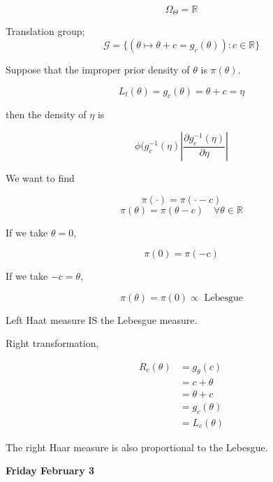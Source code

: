 \documentclass[11pt,fleqn]{book} %
\begin{document}
\begin{example}
	$$ \Omega_\Theta = \mathbb{R}$$

Translation group;
	$$\mathcal{G} = \{(\theta \mapsto \theta + c = g_c(\theta)): c \in \mathbb{R} \} $$


Suppose that the improper prior density of $\theta$ is $\pi(\theta)$. 

		$$L_t(\theta)= g_c(\theta) = \theta + c = \eta $$

then the density of $\eta$ is 

		$$\phi(g_c^{-1}(\eta) |\frac{\partial g_c^{-1}(\eta)}{\partial\eta}| $$

We want to find

		$$\pi(\cdot)  = \pi(\cdot - c) $$
		$$ \pi(\theta)  = \pi(\theta - c) \quad \forall \theta \in \mathbb{R}$$

If we take $\theta = 0$, 

	$$\pi(0) = \pi(-c) $$


If we take $-c = \theta$, 

		$$\pi(\theta) = \pi(0) \propto \text{ Lebesgue} $$

	Left Haat measure IS the Lebesgue measure. 

Right transformation, 
		
		\begin{align*}
			R_c(\theta) &= g_\theta(c)\\
				&=c + \theta\\
				&= \theta + c\\
				&=g_c(\theta)\\
				&= L_c(\theta)
		\end{align*}

	The right Haar measure is also proportional to the Lebesgue. 
\end{example}

\textbf{Friday February 3}\\
\end{document}
